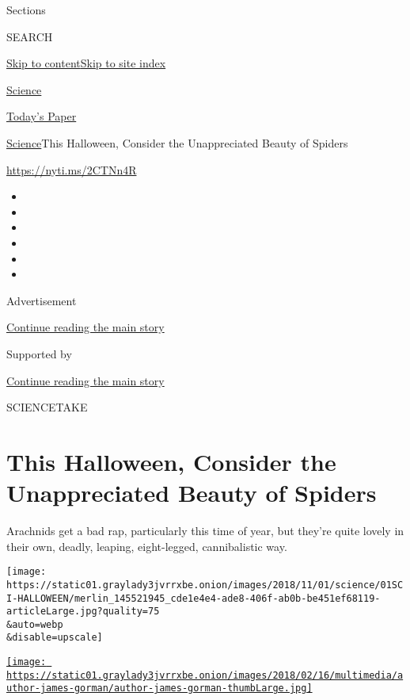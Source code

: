 Sections

SEARCH

\protect\hyperlink{site-content}{Skip to
content}\protect\hyperlink{site-index}{Skip to site index}

\href{https://www.nytimes3xbfgragh.onion/section/science}{Science}

\href{https://myaccount.nytimes3xbfgragh.onion/auth/login?response_type=cookie\&client_id=vi}{}

\href{https://www.nytimes3xbfgragh.onion/section/todayspaper}{Today's
Paper}

\href{/section/science}{Science}\textbar{}This Halloween, Consider the
Unappreciated Beauty of Spiders

\url{https://nyti.ms/2CTNn4R}

\begin{itemize}
\item
\item
\item
\item
\item
\item
\end{itemize}

Advertisement

\protect\hyperlink{after-top}{Continue reading the main story}

Supported by

\protect\hyperlink{after-sponsor}{Continue reading the main story}

SCIENCETAKE

\hypertarget{this-halloween-consider-the-unappreciated-beauty-of-spiders}{%
\section{This Halloween, Consider the Unappreciated Beauty of
Spiders}\label{this-halloween-consider-the-unappreciated-beauty-of-spiders}}

Arachnids get a bad rap, particularly this time of year, but they're
quite lovely in their own, deadly, leaping, eight-legged, cannibalistic
way.

\texttt{[image: https://static01.graylady3jvrrxbe.onion/images/2018/11/01/science/01SCI-HALLOWEEN/merlin\_145521945\_cde1e4e4-ade8-406f-ab0b-be451ef68119-articleLarge.jpg?quality=75\\\&auto=webp\\\&disable=upscale]}

\href{https://www.nytimes3xbfgragh.onion/by/james-gorman}{\texttt{[image: https://static01.graylady3jvrrxbe.onion/images/2018/02/16/multimedia/author-james-gorman/author-james-gorman-thumbLarge.jpg]}}

